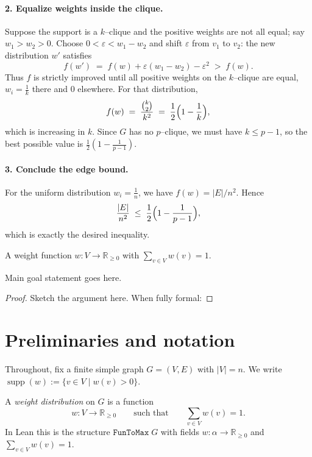 \paragraph{2. Equalize weights inside the clique.}
Suppose the support is a $k$–clique and the positive weights are not all
equal; say $w_1>w_2>0$.  Choose $0<\varepsilon<w_1-w_2$ and shift
$\varepsilon$ from $v_1$ to $v_2$: the new distribution $w'$ satisfies
\[
  f(w') \;=\; f(w) + \varepsilon (w_1-w_2) - \varepsilon^2 \;>\; f(w).
\]
Thus $f$ is strictly improved until all positive weights on the $k$–clique
are equal, $w_i=\tfrac1k$ there and $0$ elsewhere.  For that distribution,
\[
  f(w)\;=\; \frac{\binom{k}{2}}{k^2}
  \;=\; \frac12\Bigl(1-\frac1k\Bigr),
\]
which is increasing in $k$.  Since $G$ has no $p$–clique, we must have
$k\le p-1$, so the best possible value is
$\frac12(1-\frac1{p-1})$.

\paragraph{3. Conclude the edge bound.}
For the uniform distribution $w_i=\tfrac1n$, we have
$f(w)=|E|/n^2$.  Hence
\[
  \frac{|E|}{n^2} \;\le\; \frac12\Bigl(1-\frac1{p-1}\Bigr),
\]
which is exactly the desired inequality.
\qedhere

\begin{definition}\label{def:weight_fn}
A weight function $w: V \to \mathbb{R}_{\ge 0}$ with $\sum_{v\in V} w(v)=1$.
\end{definition}

\begin{theorem}\label{thm:main}
Main goal statement goes here.
\end{theorem}

\begin{proof}
Sketch the argument here. When fully formal:
\leanok
\end{proof}

\section{Preliminaries and notation}

Throughout, fix a finite simple graph \(G=(V,E)\) with \(|V|=n\).
We write \(\operatorname{supp}(w):=\{v\in V\mid w(v)>0\}\).

\begin{definition}\label{def:weight_distribution}
A \emph{weight distribution} on \(G\) is a function
\[
  w:V\to \mathbb{R}_{\ge 0}
  \qquad\text{such that}\qquad
  \sum_{v\in V} w(v)=1.
\]
In Lean this is the structure \(\texttt{FunToMax}\;G\) with fields \(w:\alpha\to\mathbb{R}_{\ge0}\) and
\(\sum_{v\in V} w(v)=1\).
\leanok
\end{definition}

